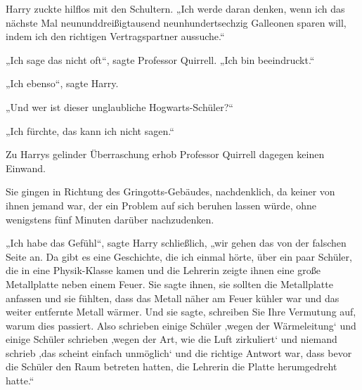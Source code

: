 Harry zuckte hilflos mit den Schultern.
„Ich werde daran denken, wenn ich das nächste Mal neununddreißigtausend neunhundertsechzig Galleonen sparen will, indem ich den richtigen Vertragspartner aussuche.“

„Ich sage das nicht oft“, sagte Professor Quirrell.
„Ich bin beeindruckt.“

„Ich ebenso“, sagte Harry.

„Und wer ist dieser unglaubliche Hogwarts-Schüler?“

„Ich fürchte, das kann ich nicht sagen.“

Zu Harrys gelinder Überraschung erhob Professor Quirrell dagegen keinen Einwand.

Sie gingen in Richtung des Gringotts-Gebäudes, nachdenklich, da keiner von ihnen jemand war, der ein Problem auf sich beruhen lassen würde, ohne wenigstens fünf Minuten darüber nachzudenken.

„Ich habe das Gefühl“, sagte Harry schließlich, „wir gehen das von der falschen Seite an. Da gibt es eine Geschichte, die ich einmal hörte, über ein paar Schüler, die in eine Physik-Klasse kamen und die Lehrerin zeigte ihnen eine große Metallplatte neben einem Feuer. Sie sagte ihnen, sie sollten die Metallplatte anfassen und sie fühlten, dass das Metall näher am Feuer kühler war und das weiter entfernte Metall wärmer. Und sie sagte, schreiben Sie Ihre Vermutung auf, warum dies passiert. Also schrieben einige Schüler ‚wegen der Wärmeleitung‘ und einige Schüler schrieben ‚wegen der Art, wie die Luft zirkuliert‘ und niemand schrieb ‚das scheint einfach unmöglich‘ und die richtige Antwort war, dass bevor die Schüler den Raum betreten hatten, die Lehrerin die Platte herumgedreht hatte.“

